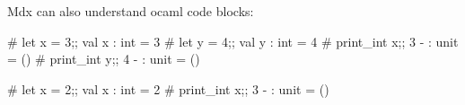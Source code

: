 Mdx can also understand ocaml code blocks:


\begin{ocaml}
# let x = 3;;
val x : int = 3
# let y = 4;;
val y : int = 4
# print_int x;;
3
- : unit = ()
# print_int y;;
4
- : unit = ()
\end{ocaml}

\begin{ocaml}
\end{ocaml}

\begin{ocaml}
\end{ocaml}

\begin{ocaml}
\end{ocaml}

\begin{ocaml}
# let x = 2;;
val x : int = 2
# print_int x;;
3
- : unit = ()
\end{ocaml}

\begin{ocaml}
\end{ocaml}
